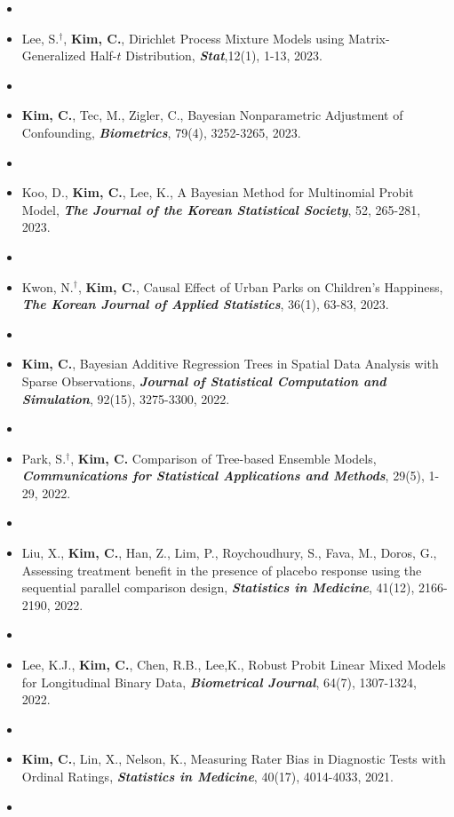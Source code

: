 \documentclass[10pt]{article}
\newenvironment{innerlist}[1][\enskip\textbullet]%
        {\begin{itemize}[#1,leftmargin=*,parsep=0pt,itemsep=0pt,topsep=0pt,partopsep=0pt]}
        {\end{itemize}}
\begin{document}
\begin{innerlist}
\item[]
\item[] Lee, S.$^\dagger$, {\bf Kim, C.}, Dirichlet Process Mixture Models using Matrix-Generalized Half-$t$ Distribution, \textbf{\textit{Stat}},12(1), 1-13, 2023.
\item[]
    \item[] {\bf Kim, C.},  Tec, M., Zigler, C.,
Bayesian Nonparametric Adjustment of Confounding, \textbf{\textit{Biometrics}}, 79(4), 3252-3265, 2023.
\item[]
\item[] Koo, D., {\bf Kim, C.}, Lee, K., A Bayesian Method for Multinomial Probit Model, \textbf{\textit{The Journal of the Korean Statistical Society}}, 52, 265-281, 2023.
\item[]
            \item[] Kwon, N.$^\dagger$, {\bf Kim, C.},
Causal Effect of Urban Parks on Children’s Happiness, \textbf{\textit{The Korean Journal of Applied Statistics}}, 36(1), 63-83, 2023.
\item[]
            \item[] {\bf Kim, C.},
Bayesian Additive Regression Trees in Spatial Data Analysis with Sparse Observations, \textbf{\textit{Journal of Statistical Computation and Simulation}}, 92(15), 3275-3300, 2022.
\item[]
            \item[] Park, S.$^\dagger$, {\bf Kim, C.}  
Comparison of Tree-based Ensemble Models, \textbf{\textit{Communications for Statistical Applications and Methods}}, 29(5), 1-29, 2022.
\item[]
    \item[] Liu, X., {\bf Kim, C.}, Han, Z., Lim, P., Roychoudhury, S., Fava, M., Doros, G., 
        Assessing treatment benefit in the presence of placebo response using the sequential parallel comparison design, \textbf {\textit{Statistics in Medicine}}, 41(12), 2166-2190, 2022.
\item[]
            \item[] Lee, K.J., {\bf Kim, C.}, Chen, R.B., Lee,K.,  
Robust Probit Linear Mixed Models for Longitudinal Binary Data, \textbf {\textit{Biometrical Journal}}, 64(7), 1307-1324, 2022.
\item[]
    \item[] {\bf Kim, C.}, Lin, X., Nelson, K., 
       Measuring Rater Bias in Diagnostic Tests with Ordinal Ratings,  \textbf {\textit{Statistics in Medicine}}, 40(17), 4014-4033, 2021.
        \item[]

\end{innerlist}
\end{document}
